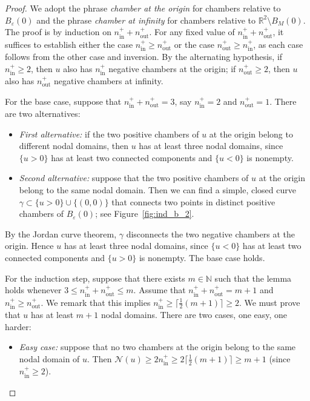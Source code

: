 \documentclass[10pt]{amsart}
\theoremstyle{definition}\newtheorem{defi}[theo]{Definition}\newtheorem{rema}[theo]{Remark}\newtheorem{exam}[theo]{Example}\newtheorem{exem}[theo]{Example}\newtheorem{nota}[theo]{Notation}
\newcommand{\N}{\mathbb{N}}
\newcommand{\R}{\mathbb{R}}
\newcommand{\nin}{n^+_{\mathrm{in}}}
\newcommand{\nout}{n^+_{\mathrm{out}}}
\newcommand{\nodal}{\mathcal{N}}
\renewcommand{\epsilon}{\varepsilon}
\begin{document}
\begin{proof}
We adopt the phrase \emph{chamber at the origin} for chambers relative to $B_\epsilon(0)$ and the phrase \emph{chamber at infinity} for chambers relative to $\R^2\setminus B_M(0)$. The proof is by induction on $\nin + \nout$. For any fixed value of $\nin+\nout$, it suffices to establish either the case $\nin\geq\nout$ or the case $\nout\geq \nin$, as each case follows from the other case and inversion. By the alternating hypothesis, if $\nin\geq 2$, then $u$ also has $\nin$ negative chambers at the origin; if $\nout\geq 2$, then $u$ also has $\nout$ negative chambers at infinity.

For the base case, suppose that $\nin+\nout=3$, say $\nin=2$ and $\nout=1$. There are two alternatives:
\begin{itemize}
\item \emph{First alternative:} if the two positive chambers of $u$ at the origin belong to different nodal domains, then $u$ has at least three nodal domains, since $\{u>0\}$ has at least two connected components and $\{u<0\}$ is nonempty.
\item \emph{Second alternative:} suppose that the two positive chambers of $u$ at the origin belong to the same nodal domain. Then we can find a simple, closed curve $\gamma \subset \{ u >0\}\cup\{(0,0)\}$ that connects two points in distinct positive chambers of $B_\epsilon(0)$; see Figure~\ref{fig:ind_b_2}.
\end{itemize}
By the Jordan curve theorem, $\gamma$ disconnects the two negative chambers at the origin. Hence $u$ has at least three nodal domains, since $\{ u < 0\}$ has at least two connected components and $\{u>0\}$ is nonempty. The base case holds.

For the induction step, suppose that there exists $m\in\N$ such that the lemma holds whenever $3 \le \nin + \nout \le m$. Assume that $\nin+\nout=m+1$ and $\nin\geq \nout$. We remark that this implies $\nin\geq \lceil \frac{1}{2}(m+1)\rceil\geq 2$. We must prove that $u$ has at least $m+1$ nodal domains. There are two cases, one easy, one harder:
\begin{itemize}
\item
\emph{Easy case:} suppose that no two chambers at the origin belong to the same nodal domain of $u$. Then $\nodal(u)\geq 2\nin\geq 2\lceil \frac{1}{2}(m+1)\rceil\geq m+1$ (since $\nin\geq 2$).


\end{itemize}
\end{proof}
\end{document}
